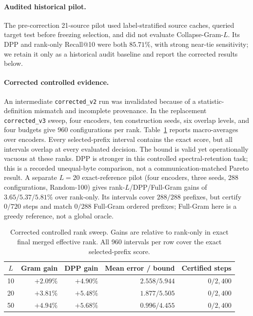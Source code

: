 \documentclass{article}
\begin{document}
\paragraph{Audited historical pilot.}
The pre-correction 21-source pilot used label-stratified source caches,
queried target test before freezing selection, and did not evaluate
Collapse-Gram-$L$.  Its DPP and rank-only Recall@10 were both $85.71\%$, with
strong near-tie sensitivity; we retain it only as a historical audit baseline
and report the corrected results below.

\paragraph{Corrected controlled evidence.}
An intermediate \texttt{corrected\_v2} run was invalidated because of a
statistic-definition mismatch and incomplete provenance.  In the replacement
\texttt{corrected\_v3} sweep, four encoders, ten construction seeds, six
overlap levels, and four budgets give 960 configurations per rank.  Table~\ref{tab:v3_rank_sweep}
reports macro-averages over encoders.  Every selected-prefix interval contains
the exact score, but all intervals overlap at every evaluated decision.  The
bound is valid yet operationally vacuous at these ranks.  DPP is stronger in
this controlled spectral-retention task; this is a recorded unequal-byte
comparison, not a communication-matched Pareto result.
A separate $L=20$ exact-reference pilot (four encoders, three seeds, 288
configurations, Random-100) gives rank-$L$/DPP/Full-Gram gains of
$3.65/5.37/5.81\%$ over rank-only.  Its intervals cover $288/288$ prefixes,
but certify $0/720$ steps and match $0/288$ Full-Gram ordered prefixes;
Full-Gram here is a greedy reference, not a global oracle.

\begin{table}[t]
\centering
\caption{Corrected controlled rank sweep.  Gains are relative to rank-only in
exact final merged effective rank.  All 960 intervals per row cover the exact
selected-prefix score.}
\label{tab:v3_rank_sweep}
\small
\setlength{\tabcolsep}{3.2pt}
\begin{tabular}{crrrr}
\toprule
$L$ & Gram gain & DPP gain & Mean error / bound & Certified steps \\
\midrule
10 & $+2.09\%$ & $+4.90\%$ & $2.558/5.944$ & $0/2{,}400$ \\
20 & $+3.81\%$ & $+5.48\%$ & $1.877/5.505$ & $0/2{,}400$ \\
50 & $+4.94\%$ & $+5.68\%$ & $0.996/4.455$ & $0/2{,}400$ \\
\bottomrule
\end{tabular}\normalsize
\end{table}
\end{document}
